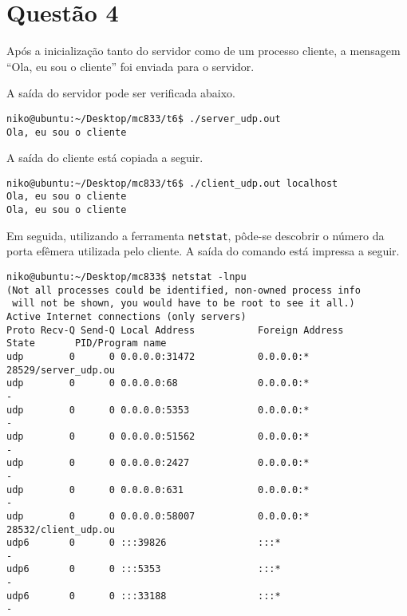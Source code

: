 \documentclass[a4paper,10pt]{article}
\begin{document}
\section{Questão 4}

Após a inicialização tanto do servidor como de um processo cliente, a mensagem ``Ola, eu sou o cliente'' foi enviada para o servidor.

A saída do servidor pode ser verificada abaixo.

\begin{lstlisting}
niko@ubuntu:~/Desktop/mc833/t6$ ./server_udp.out
Ola, eu sou o cliente

\end{lstlisting}

A saída do cliente está copiada a seguir.

\begin{lstlisting}
niko@ubuntu:~/Desktop/mc833/t6$ ./client_udp.out localhost
Ola, eu sou o cliente
Ola, eu sou o cliente

\end{lstlisting}

Em seguida, utilizando a ferramenta {\tt netstat}, pôde-se descobrir o número da porta efêmera utilizada pelo cliente. A saída do comando está impressa a seguir.

\begin{lstlisting}
niko@ubuntu:~/Desktop/mc833$ netstat -lnpu
(Not all processes could be identified, non-owned process info
 will not be shown, you would have to be root to see it all.)
Active Internet connections (only servers)
Proto Recv-Q Send-Q Local Address           Foreign Address         State       PID/Program name
udp        0      0 0.0.0.0:31472           0.0.0.0:*                           28529/server_udp.ou
udp        0      0 0.0.0.0:68              0.0.0.0:*                           -               
udp        0      0 0.0.0.0:5353            0.0.0.0:*                           -               
udp        0      0 0.0.0.0:51562           0.0.0.0:*                           -               
udp        0      0 0.0.0.0:2427            0.0.0.0:*                           -               
udp        0      0 0.0.0.0:631             0.0.0.0:*                           -               
udp        0      0 0.0.0.0:58007           0.0.0.0:*                           28532/client_udp.ou
udp6       0      0 :::39826                :::*                                -               
udp6       0      0 :::5353                 :::*                                -               
udp6       0      0 :::33188                :::*                                -               

\end{lstlisting}
\end{document}
